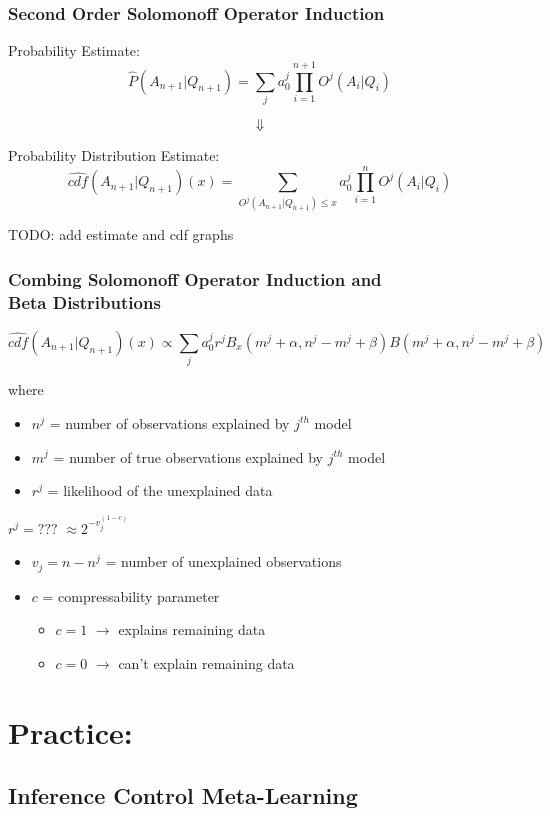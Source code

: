 \documentclass{beamer}
\begin{document}
\begin{frame}
  \frametitle{Second Order Solomonoff Operator Induction}

  Probability Estimate:
  $$
  \hat{P}(A_{n+1}|Q_{n+1}) = \sum_j a_0^j \prod_{i=1}^{n+1} O^j(A_i|Q_i)
  $$

  $$
  \Downarrow
  $$
  
  Probability Distribution Estimate:
  $$
    \hat{cdf}(A_{n+1}|Q_{n+1})(x) = \sum_{O^j(A_{n+1}|Q_{n+1}) \le x}
    a_0^j \prod_{i=1}^{n} O^j(A_i|Q_i)
  $$

  TODO: add estimate and cdf graphs
\end{frame}

\begin{frame}
  \frametitle{Combing Solomonoff Operator Induction and\\
    Beta Distributions}

  $$
    \hat{cdf}(A_{n+1}|Q_{n+1})(x) \propto \sum_j a_0^j r^j
    B_x(m^j+\alpha, n^j-m^j+\beta)
    B(m^j+\alpha, n^j-m^j+\beta)
  $$

  where
  \begin{itemize}
  \item $n^j$ = number of observations explained by $j^{th}$ model    
  \item $m^j$ = number of true observations explained by $j^{th}$ model
  \item $r^j$ = likelihood of the unexplained data
  \end{itemize}

  $r^j = ???$ \pause $\approx 2^{-v_j^{(1-c)}}$
  \begin{itemize}
  \item $v_j = n-n^j$ = number of unexplained observations
  \item $c$ = compressability parameter
    \begin{itemize}
    \item $c=1$ $\rightarrow$ explains remaining data%
    \item $c=0$ $\rightarrow$ can't explain remaining data
    \end{itemize}
  \end{itemize}
\end{frame}

\section{Practice:}
\subsection{Inference Control Meta-Learning}
\end{document}
